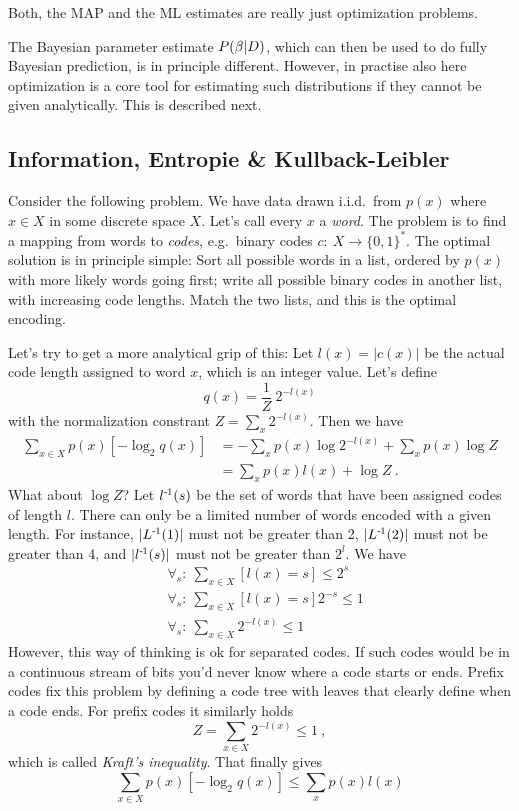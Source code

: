 Both, the MAP and the ML estimates are really just optimization
problems.

The Bayesian parameter estimate $P(\beta|D)$, which can
then be used to do fully Bayesian prediction, is in principle
different. However, in practise also here optimization is a core tool
for estimating such distributions if they cannot be given
analytically. This is described next.


\subsection{Information, Entropie \& Kullback-Leibler}

Consider the following problem. We have data drawn i.i.d.\ from $p(x)$
where $x\in X$ in some discrete space $X$. Let's call every $x$
a \emph{word}. The problem is to find a mapping from words
to \emph{codes}, e.g.\ binary codes $c:~ X \to \{0,1\}^*$. The optimal
solution is in principle simple: Sort all possible words in a list,
ordered by $p(x)$ with more likely words going first; write all
possible binary codes in another list, with increasing code
lengths. Match the two lists, and this is the optimal
encoding.

Let's try to get a more analytical grip of this: Let $l(x) = |c(x)|$
be the actual code length assigned to word $x$, which is an integer
value. Let's define 
\begin{equation}
q(x) = \frac{1}{Z}~ 2^{-l(x)}
\end{equation}
with the normalization constrant $Z=\sum_x 2^{-l(x)}$. Then we have
\begin{align}
\sum_{x\in X} p(x) [-\log_2 q(x)]
&= -\sum_x p(x) \log 2^{-l(x)} + \sum_x p(x) \log Z \\
&= \sum_x p(x) l(x) + \log Z ~.
\end{align}
What about $\log Z$? Let $l^{{\hspace*{-.0pt}\text{\rm -}\hspace*{-.5pt}}1}(s)$ be the
set of words that have been assigned codes of length $l$. There can
only be a limited number of words encoded with a given length. For
instance, $|L^{{\hspace*{-.0pt}\text{\rm -}\hspace*{-.5pt}}1}(1)|$ must not be greater than 2, $|L^{{\hspace*{-.0pt}\text{\rm -}\hspace*{-.5pt}}1}(2)|$ must not
be greater than 4, and $|l^{{\hspace*{-.0pt}\text{\rm -}\hspace*{-.5pt}}1}(s)|$ must not be greater than $2^l$. We
have
\begin{align}
&\forall_s:~ \sum_{x\in X} [l(x)=s] \le 2^s \\
&\forall_s:~ \sum_{x\in X} [l(x)=s]  2^{-s} \le 1 \\
&\forall_s:~ \sum_{x\in X} 2^{-l(x)} \le 1
\end{align}
However, this way of thinking is ok for separated codes. If such codes
would be in a continuous stream of bits you'd never know where a code
starts or ends. Prefix codes fix this problem by defining a code tree
with leaves that clearly define when a code ends. For prefix codes it
similarly holds 
\begin{equation}
Z = \sum_{x\in X} 2^{-l(x)} \le 1 ~,
\end{equation}
which is called \emph{Kraft's inequality}. That finally gives
\begin{equation}
\sum_{x\in X} p(x) [-\log_2 q(x)]
\le \sum_x p(x) l(x)
\end{equation}


